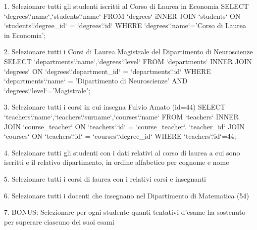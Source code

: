 1. Selezionare tutti gli studenti iscritti al Corso di Laurea in Economia
SELECT `degrees`.`name`,`students`.`name` FROM `degrees` iNNER JOIN `students` ON `students`.`degree_id` = `degrees`.`id` WHERE `degrees`.`name`='Corso di Laurea in Economia';


2. Selezionare tutti i Corsi di Laurea Magistrale del Dipartimento di Neuroscienze
SELECT `departments`.`name`,`degrees`.`level` FROM `departments` INNER JOIN `degrees` ON `degrees`.`department_id` = `departments`.`id` WHERE `departments`.`name` = 'Dipartimento di Neuroscienze' AND `degrees`.`level`='Magistrale';

3. Selezionare tutti i corsi in cui insegna Fulvio Amato (id=44)
SELECT `teachers`.`name`,`teachers`.`surname`,`courses`.`name` FROM `teachers` INNER JOIN `course_teacher` ON `teachers`.`id` = `course_teacher`. `teacher_id` JOIN `courses` ON `teachers`.`id` = `courses`.`degree_id` WHERE `teachers`.`id`=44;

4. Selezionare tutti gli studenti con i dati relativi al corso di laurea a cui sono iscritti e il
relativo dipartimento, in ordine alfabetico per cognome e nome


5. Selezionare tutti i corsi di laurea con i relativi corsi e insegnanti


6. Selezionare tutti i docenti che insegnano nel Dipartimento di Matematica (54)


7. BONUS: Selezionare per ogni studente quanti tentativi d’esame ha sostenuto per
superare ciascuno dei suoi esami